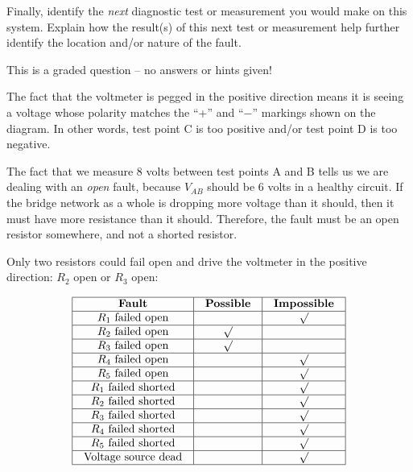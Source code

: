 Finally, identify the {\it next} diagnostic test or measurement you would make on this system.  Explain how the result(s) of this next test or measurement help further identify the location and/or nature of the fault.

\vfil 

\eject






This is a graded question -- no answers or hints given!







The fact that the voltmeter is pegged in the positive direction means it is seeing a voltage whose polarity matches the ``+'' and ``$-$'' markings shown on the diagram.  In other words, test point C is too positive and/or test point D is too negative.

\vskip 10pt

The fact that we measure 8 volts between test points A and B tells us we are dealing with an {\it open} fault, because $V_{AB}$ should be 6 volts in a healthy circuit.  If the bridge network as a whole is dropping more voltage than it should, then it must have more resistance than it should.  Therefore, the fault must be an open resistor somewhere, and not a shorted resistor.

\vskip 10pt

Only two resistors could fail open and drive the voltmeter in the positive direction: $R_2$ open or $R_3$ open:


$$\vbox{\offinterlineskip
\halign{\strut
\vrule \quad\hfil # \ \hfil & 
\vrule \quad\hfil # \ \hfil & 
\vrule \quad\hfil # \ \hfil \vrule \cr
\noalign{\hrule}
%
{\bf Fault} & {\bf Possible} & {\bf Impossible} \cr
%
\noalign{\hrule}
%
$R_1$ failed open &  & $\surd$ \cr
%
\noalign{\hrule}
%
$R_2$ failed open & $\surd$ &  \cr
%
\noalign{\hrule}
%
$R_3$ failed open & $\surd$ &  \cr
%
\noalign{\hrule}
%
$R_4$ failed open &  & $\surd$ \cr
%
\noalign{\hrule}
%
$R_5$ failed open &  & $\surd$ \cr
%
\noalign{\hrule}
%
$R_1$ failed shorted &  & $\surd$ \cr
%
\noalign{\hrule}
%
$R_2$ failed shorted &  & $\surd$ \cr
%
\noalign{\hrule}
%
$R_3$ failed shorted &  & $\surd$ \cr
%
\noalign{\hrule}
%
$R_4$ failed shorted &  & $\surd$ \cr
%
\noalign{\hrule}
%
$R_5$ failed shorted &  & $\surd$ \cr
%
\noalign{\hrule}
%
Voltage source dead &  & $\surd$ \cr
%
\noalign{\hrule}
} %
}$$ %

